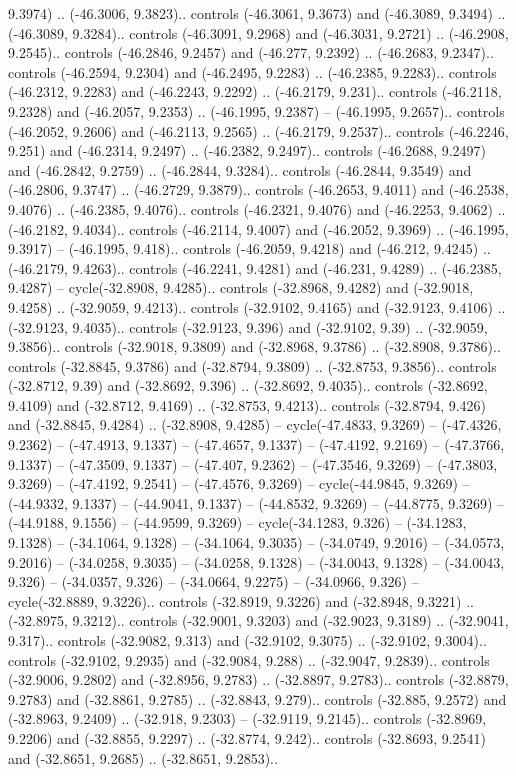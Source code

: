 \begin{scope}[shift={(2.5552, 9.9912)}]
\begin{scope}[shift={(48.1654, -14.8546)}]
9.3974) .. (-46.3006, 9.3823).. controls (-46.3061, 9.3673) and (-46.3089, 9.3494) .. (-46.3089, 9.3284).. controls (-46.3091, 9.2968) and (-46.3031, 9.2721) .. (-46.2908, 9.2545).. controls (-46.2846, 9.2457) and (-46.277, 9.2392) .. (-46.2683, 9.2347).. controls (-46.2594, 9.2304) and (-46.2495, 9.2283) .. (-46.2385, 9.2283).. controls (-46.2312, 9.2283) and (-46.2243, 9.2292) .. (-46.2179, 9.231).. controls (-46.2118, 9.2328) and (-46.2057, 9.2353) .. (-46.1995, 9.2387) -- (-46.1995, 9.2657).. controls (-46.2052, 9.2606) and (-46.2113, 9.2565) .. (-46.2179, 9.2537).. controls (-46.2246, 9.251) and (-46.2314, 9.2497) .. (-46.2382, 9.2497).. controls (-46.2688, 9.2497) and (-46.2842, 9.2759) .. (-46.2844, 9.3284).. controls (-46.2844, 9.3549) and (-46.2806, 9.3747) .. (-46.2729, 9.3879).. controls (-46.2653, 9.4011) and (-46.2538, 9.4076) .. (-46.2385, 9.4076).. controls (-46.2321, 9.4076) and (-46.2253, 9.4062) .. (-46.2182, 9.4034).. controls (-46.2114, 9.4007) and (-46.2052, 9.3969) .. (-46.1995, 9.3917) -- (-46.1995, 9.418).. controls (-46.2059, 9.4218) and (-46.212, 9.4245) .. (-46.2179, 9.4263).. controls (-46.2241, 9.4281) and (-46.231, 9.4289) .. (-46.2385, 9.4287) -- cycle(-32.8908, 9.4285).. controls (-32.8968, 9.4282) and (-32.9018, 9.4258) .. (-32.9059, 9.4213).. controls (-32.9102, 9.4165) and (-32.9123, 9.4106) .. (-32.9123, 9.4035).. controls (-32.9123, 9.396) and (-32.9102, 9.39) .. (-32.9059, 9.3856).. controls (-32.9018, 9.3809) and (-32.8968, 9.3786) .. (-32.8908, 9.3786).. controls (-32.8845, 9.3786) and (-32.8794, 9.3809) .. (-32.8753, 9.3856).. controls (-32.8712, 9.39) and (-32.8692, 9.396) .. (-32.8692, 9.4035).. controls (-32.8692, 9.4109) and (-32.8712, 9.4169) .. (-32.8753, 9.4213).. controls (-32.8794, 9.426) and (-32.8845, 9.4284) .. (-32.8908, 9.4285) -- cycle(-47.4833, 9.3269) -- (-47.4326, 9.2362) -- (-47.4913, 9.1337) -- (-47.4657, 9.1337) -- (-47.4192, 9.2169) -- (-47.3766, 9.1337) -- (-47.3509, 9.1337) -- (-47.407, 9.2362) -- (-47.3546, 9.3269) -- (-47.3803, 9.3269) -- (-47.4192, 9.2541) -- (-47.4576, 9.3269) -- cycle(-44.9845, 9.3269) -- (-44.9332, 9.1337) -- (-44.9041, 9.1337) -- (-44.8532, 9.3269) -- (-44.8775, 9.3269) -- (-44.9188, 9.1556) -- (-44.9599, 9.3269) -- cycle(-34.1283, 9.326) -- (-34.1283, 9.1328) -- (-34.1064, 9.1328) -- (-34.1064, 9.3035) -- (-34.0749, 9.2016) -- (-34.0573, 9.2016) -- (-34.0258, 9.3035) -- (-34.0258, 9.1328) -- (-34.0043, 9.1328) -- (-34.0043, 9.326) -- (-34.0357, 9.326) -- (-34.0664, 9.2275) -- (-34.0966, 9.326) -- cycle(-32.8889, 9.3226).. controls (-32.8919, 9.3226) and (-32.8948, 9.3221) .. (-32.8975, 9.3212).. controls (-32.9001, 9.3203) and (-32.9023, 9.3189) .. (-32.9041, 9.317).. controls (-32.9082, 9.313) and (-32.9102, 9.3075) .. (-32.9102, 9.3004).. controls (-32.9102, 9.2935) and (-32.9084, 9.288) .. (-32.9047, 9.2839).. controls (-32.9006, 9.2802) and (-32.8956, 9.2783) .. (-32.8897, 9.2783).. controls (-32.8879, 9.2783) and (-32.8861, 9.2785) .. (-32.8843, 9.279).. controls (-32.885, 9.2572) and (-32.8963, 9.2409) .. (-32.918, 9.2303) -- (-32.9119, 9.2145).. controls (-32.8969, 9.2206) and (-32.8855, 9.2297) .. (-32.8774, 9.242).. controls (-32.8693, 9.2541) and (-32.8651, 9.2685) .. (-32.8651, 9.2853).. 
\end{scope}
\end{scope}
